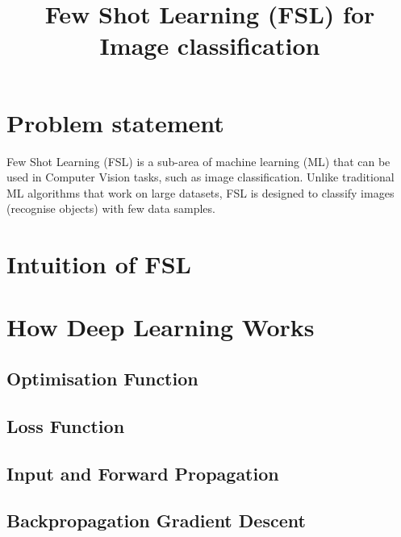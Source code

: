 \documentclass[12pt, letterpaper]{article}
\title{Few Shot Learning (FSL) for Image classification}
\begin{document}
\maketitle

\section{Problem statement}
    Few Shot Learning (FSL) is a sub-area of machine learning (ML) that 
    can be used in Computer Vision  tasks, such as image classification.
    Unlike traditional ML algorithms that work on large datasets, FSL is designed to classify images 
    (recognise objects) with few data samples.



\section{Intuition of FSL}


\section{How Deep Learning Works}

\subsection{Optimisation Function}

\subsection{Loss Function}


\subsection{Input and Forward Propagation}


\subsection{Backpropagation Gradient Descent}
\end{document}

